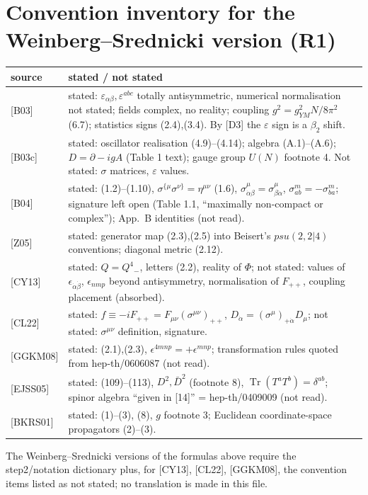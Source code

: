\documentclass[10pt]{article}
\begin{document}
\section{Convention inventory for the Weinberg--Srednicki version (R1)}
\begin{longtable}{p{1.6cm}p{15cm}}
source & stated / not stated \\ \hline
{[B03]} & stated: $\varepsilon_{\alpha\beta},\varepsilon^{abc}$ totally antisymmetric, numerical normalisation not stated; fields complex, no reality; coupling $g^2=g_{YM}^2N/8\pi^2$ (6.7); statistics signs (2.4),(3.4). By [D3] the $\varepsilon$ sign is a $\beta_2$ shift. \\
{[B03c]} & stated: oscillator realisation (4.9)--(4.14); algebra (A.1)--(A.6); $D=\partial-igA$ (Table 1 text); gauge group $U(N)$ footnote 4. Not stated: $\sigma$ matrices, $\varepsilon$ values. \\
{[B04]} & stated: (1.2)--(1.10), $\sigma^{\{\mu}\sigma^{\nu\}}=\eta^{\mu\nu}$ (1.6), $\sigma^\mu_{\dot\alpha\beta}=\sigma^\mu_{\beta\dot\alpha}$, $\sigma^m_{ab}=-\sigma^m_{ba}$; signature left open (Table 1.1, ``maximally non-compact or complex''); App.\ B identities (not read). \\
{[Z05]} & stated: generator map (2.3),(2.5) into Beisert's $psu(2,2|4)$ conventions; diagonal metric (2.12). \\
{[CY13]} & stated: $Q=Q^4{}_-$, letters (2.2), reality of $\Phi$; not stated: values of $\epsilon_{\dot\alpha\dot\beta}$, $\epsilon_{nmp}$ beyond antisymmetry, normalisation of $F_{++}$, coupling placement (absorbed). \\
{[CL22]} & stated: $f\equiv-iF_{++}=F_{\mu\nu}(\sigma^{\mu\nu})_{++}$, $D_{\dot\alpha}=(\sigma^\mu)_{+\dot\alpha}D_\mu$; not stated: $\sigma^{\mu\nu}$ definition, signature. \\
{[GGKM08]} & stated: (2.1),(2.3), $\epsilon^{4mnp}=+\epsilon^{mnp}$; transformation rules quoted from hep-th/0606087 (not read). \\
{[EJSS05]} & stated: (109)--(113), $D^2,\bar D^2$ (footnote 8), $\operatorname{Tr}(T^aT^b)=\delta^{ab}$; spinor algebra ``given in [14]'' = hep-th/0409009 (not read). \\
{[BKRS01]} & stated: (1)--(3), (8), $g$ footnote 3; Euclidean coordinate-space propagators (2)--(3). \\
\end{longtable}
The Weinberg--Srednicki versions of the formulas above require the step2/notation dictionary plus, for [CY13], [CL22], [GGKM08], the convention items listed as not stated; no translation is made in this file.
\end{document}
